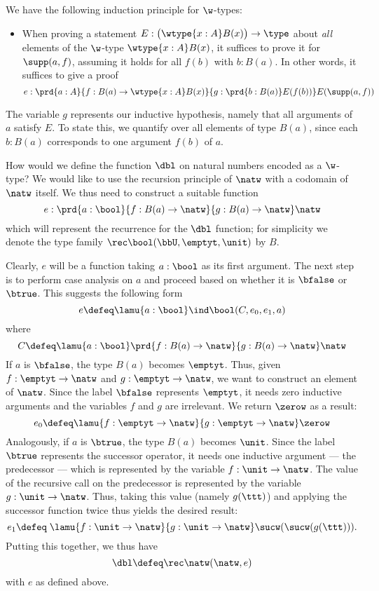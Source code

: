 %
We have the following induction principle for $\w$-types:
\begin{itemize}
\item When proving a statement $E : \big(\wtype{x:A} B(x)\big) \to \type$ about \emph{all} elements of the $\w$-type $\wtype{x:A} B(x)$, it suffices to prove it for $\supp(a,f)$, assuming it holds for all $f(b)$ with $b : B(a)$.
In other words, it suffices to give a proof
\begin{equation*}
e : \prd{a:A}{f : B(a) \to \wtype{x:A} B(x)}{g : \prd{b : B(a)} E(f(b))} E(\supp(a,f))
\end{equation*}
\end{itemize}

%
The variable $g$ represents our inductive hypothesis, namely that all arguments of $a$ satisfy $E$. To state this, we quantify over all elements of type $B(a)$, since each $b : B(a)$ corresponds to one argument $f(b)$ of $a$.

How would we define the function $\dbl$ on natural numbers encoded as a $\w$-type? We would like to use the recursion principle of $\natw$ with a codomain of $\natw$ itself. We thus need to construct a suitable function
\[e : \prd{a : \bool}{f : B(a) \to \natw}{g : B(a) \to \natw} \natw\]
which will represent the recurrence for the $\dbl$ function; for simplicity we denote the type family $\rec\bool(\bbU,\emptyt,\unit)$ by $B$.

Clearly, $e$ will be a function taking $a : \bool$ as its first argument. The next step is to perform case analysis on $a$ and proceed based on whether it is $\bfalse$ or $\btrue$. This suggests the following form
\[ e \defeq \lamu{a:\bool} \ind\bool(C,e_0,e_1,a) \]
where \[C \defeq \lamu{a:\bool} \prd{f : B(a) \to \natw}{g : B(a) \to \natw} \natw\]
If $a$ is $\bfalse$, the type $B(a)$ becomes $\emptyt$. Thus, given $f : \emptyt \to \natw$ and $g : \emptyt \to \natw$, we want to construct an element of $\natw$. Since the label $\bfalse$ represents $\emptyt$, it needs zero inductive arguments and the variables $f$ and $g$ are irrelevant. We return $\zerow$ as a result:
\[ e_0 \defeq \lamu{f:\emptyt \to \natw}{g:\emptyt \to \natw} \zerow \]
Analogously, if $a$ is $\btrue$, the type $B(a)$ becomes $\unit$.
Since the label $\btrue$ represents the successor operator, it needs one inductive argument --- the predecessor --- which is represented by the variable $f : \unit \to \natw$.
The value of the recursive call on the predecessor is represented by the variable $g : \unit \to \natw$.
Thus, taking this value (namely $g(\ttt)$) and applying the successor function twice thus yields the desired result:
\begin{equation*}
e_1 \defeq \; \lamu{f:\unit \to \natw}{g:\unit \to \natw} \sucw(\sucw(g(\ttt))).
\end{equation*}
Putting this together, we thus have
\[ \dbl \defeq \rec\natw(\natw, e) \]
with $e$ as defined above.

